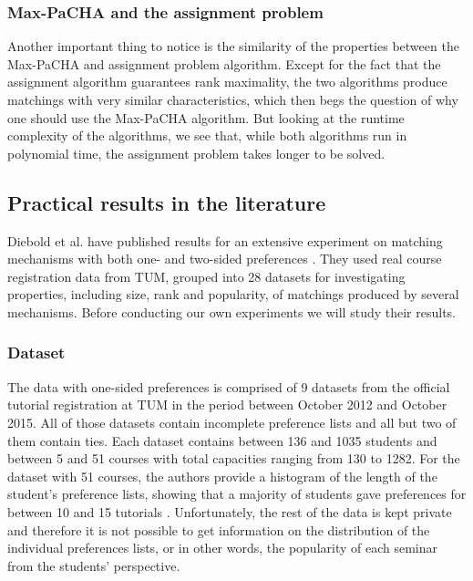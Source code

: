 \subsubsection{Max-PaCHA and the assignment problem}
Another important thing to notice is the similarity of the properties between the Max-PaCHA and assignment problem algorithm. Except for the fact that the assignment algorithm guarantees rank maximality, the two algorithms produce matchings with very similar characteristics, which then begs the question of why one should use the Max-PaCHA algorithm. But looking at the runtime complexity of the algorithms, we see that, while both algorithms run in polynomial time, the assignment problem takes longer to be solved.

\subsection{Practical results in the literature}\label{sec:practical-results-lit}
Diebold et al. have published results for an extensive experiment on matching mechanisms with both one- and two-sided preferences \cite{DieboldBenchmark}. They used real course registration data from TUM, grouped into 28 datasets for investigating properties, including size, rank and popularity, of matchings produced by several mechanisms. Before conducting our own experiments we will study their results.

\subsubsection{Dataset}
The data with one-sided preferences is comprised of 9 datasets from the official tutorial registration at TUM in the period between October 2012 and October 2015. All of those datasets contain incomplete preference lists and all but two of them contain ties. Each dataset contains between 136 and 1035 students and between 5 and 51 courses with total capacities ranging from 130 to 1282. For the dataset with 51 courses, the authors provide a histogram of the length of the student's preference lists, showing that a majority of students gave preferences for between 10 and 15 tutorials \cite{DieboldBenchmark}. Unfortunately, the rest of the data is kept private and therefore it is not possible to get information on the distribution of the individual preferences lists, or in other words, the popularity of each seminar from the students' perspective.

